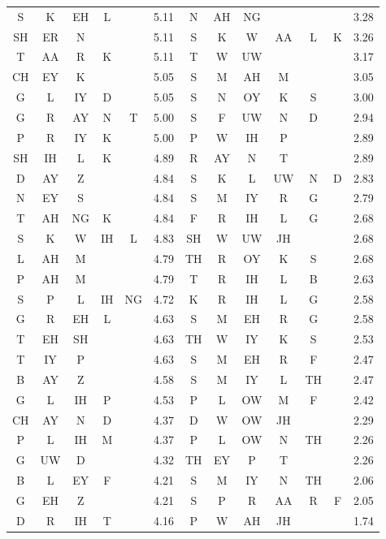 \begin{center}
\begin{longtable}{c@{ } c@{ } c@{ } c@{ } c r | c@{ } c@{ } c@{ } c@{ } c@{ } c r }
S  & K  & EH & L  &         & 5.11  & N  & AH & NG &    &    &     & 3.28 \\
SH & ER & N  &    &         & 5.11  & S  & K  & W  & AA & L  & K   & 3.26 \\
T  & AA & R  & K  &         & 5.11  & T  & W  & UW &    &    &     & 3.17 \\
CH & EY & K  &    &         & 5.05  & S  & M  & AH & M  &    &     & 3.05 \\
G  & L  & IY & D  &         & 5.05  & S  & N  & OY & K  & S  &     & 3.00 \\
G  & R  & AY & N  & T       & 5.00  & S  & F  & UW & N  & D  &     & 2.94 \\
P  & R  & IY & K  &         & 5.00  & P  & W  & IH & P  &    &     & 2.89 \\
SH & IH & L  & K  &         & 4.89  & R  & AY & N  & T  &    &     & 2.89 \\
D  & AY & Z  &    &         & 4.84  & S  & K  & L  & UW & N  & D   & 2.83 \\
N  & EY & S  &    &         & 4.84  & S  & M  & IY & R  & G  &     & 2.79 \\
T  & AH & NG & K  &         & 4.84  & F  & R  & IH & L  & G  &     & 2.68 \\
S  & K  & W  & IH & L       & 4.83  & SH & W  & UW & JH &    &     & 2.68 \\
L  & AH & M  &    &         & 4.79  & TH & R  & OY & K  & S  &     & 2.68 \\
P  & AH & M  &    &         & 4.79  & T  & R  & IH & L  & B  &     & 2.63 \\
S  & P  & L  & IH & NG      & 4.72  & K  & R  & IH & L  & G  &     & 2.58 \\
G  & R  & EH & L  &         & 4.63  & S  & M  & EH & R  & G  &     & 2.58 \\
T  & EH & SH &    &         & 4.63  & TH & W  & IY & K  & S  &     & 2.53 \\
T  & IY & P  &    &         & 4.63  & S  & M  & EH & R  & F  &     & 2.47 \\
B  & AY & Z  &    &         & 4.58  & S  & M  & IY & L  & TH &     & 2.47 \\
G  & L  & IH & P  &         & 4.53  & P  & L  & OW & M  & F  &     & 2.42 \\
CH & AY & N  & D  &         & 4.37  & D  & W  & OW & JH &    &     & 2.29 \\
P  & L  & IH & M  &         & 4.37  & P  & L  & OW & N  & TH &     & 2.26 \\
G  & UW & D  &    &         & 4.32  & TH & EY & P  & T  &    &     & 2.26 \\
B  & L  & EY & F  &         & 4.21  & S  & M  & IY & N  & TH &     & 2.06 \\
G  & EH & Z  &    &         & 4.21  & S  & P  & R  & AA & R  & F   & 2.05 \\
D  & R  & IH & T  &         & 4.16  & P  & W  & AH & JH &    &     & 1.74 \\
\bottomrule
\end{longtable}
\end{center}
